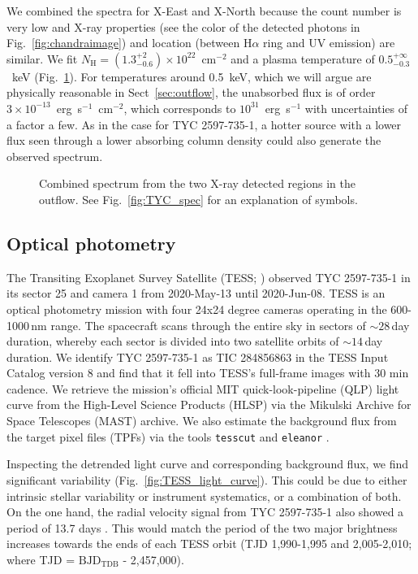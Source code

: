 \documentclass[linenumbers]{aastex631}
\begin{document}
We combined the spectra for X-East and X-North because the count number is very low and X-ray properties (see the color of the detected photons in Fig.~\ref{fig:chandraimage}) and location (between H$\alpha$ ring and UV emission) are similar.
We fit $N_\mathrm{H}=(1.3_{-0.6}^{+2})\times10^{22}$~cm$^{-2}$ and a plasma temperature of $0.5_{-0.3}^{+\infty}$~keV (Fig.~\ref{fig:combined}). For temperatures around 0.5~keV, which we will argue are physically reasonable in Sect~\ref{sec:outflow}, the unabsorbed flux is of order $3 \times 10^{-13}$~erg~s$^{-1}$~cm$^{-2}$, which corresponds to $10^{31}$~erg~s$^{-1}$ with uncertainties of a factor a few. As in the case for TYC 2597-735-1, a hotter source with a lower flux seen through a lower absorbing column density could also generate the observed spectrum.
\begin{figure}
    \caption{Combined spectrum from the two X-ray detected regions in the outflow. See Fig.~\ref{fig:TYC_spec} for an explanation of symbols.
    \label{fig:combined}}
\end{figure}


\subsection{Optical photometry}
\label{sec:TESS}
The Transiting Exoplanet Survey Satellite (TESS; \citealt{Ricker2015}) observed TYC 2597-735-1 in its sector 25 and camera 1 from 2020-May-13 until 2020-Jun-08.
TESS is an optical photometry mission with four 24x24 degree cameras operating in the 600-1000\,nm range. The spacecraft scans through the entire sky in sectors of $\sim28$\,day duration, whereby each sector is divided into two satellite orbits of $\sim14$\,day duration.
We identify TYC 2597-735-1 as TIC 284856863 in the TESS Input Catalog version 8 \citep{Stassun2019} and find that it fell into TESS's full-frame images with 30 min cadence.
We retrieve the mission's official MIT quick-look-pipeline (QLP) light curve from the High-Level Science Products (HLSP) via the Mikulski Archive for Space Telescopes (MAST) archive.
We also estimate the background flux from the target pixel files (TPFs) via the tools \texttt{tesscut} \citep{Brasseur2019} and \texttt{eleanor} \citep{Feinstein2019}.

Inspecting the detrended light curve and corresponding background flux, we find significant variability (Fig.~\ref{fig:TESS_light_curve}).
This could be due to either intrinsic stellar variability or instrument systematics, or a combination of both.
On the one hand, the radial velocity signal from TYC 2597-735-1 also showed a period of 13.7 days \citep{2020Natur.587..387H}. This would match the period of the two major brightness increases towards the ends of each TESS orbit (TJD 1,990-1,995 and 2,005-2,010; where TJD = $\mathrm{BJD_{TDB}}$ - 2,457,000).
\end{document}
